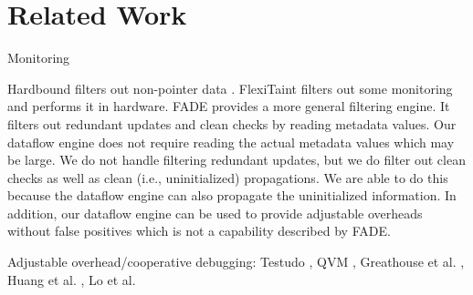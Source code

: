 \section{Related Work}
\label{sec:related}

Monitoring

Hardbound filters out non-pointer data \cite{hardbound-asplos08}. FlexiTaint filters out some monitoring
and performs it in hardware. FADE \cite{fade-hpca14} provides a more general filtering engine. It
filters out redundant updates and clean checks by reading metadata values. Our
dataflow engine does not require reading the actual metadata values which may
be large. We do not handle filtering redundant updates, but we do filter out
clean checks as well as clean (i.e., uninitialized) propagations. We are able
to do this because the dataflow engine can also propagate the uninitialized
information. In addition, our dataflow engine can be used to provide adjustable
overheads without false positives which is not a capability described by FADE.

Adjustable overhead/cooperative debugging: Testudo \cite{testudo-micro08}, QVM
\cite{qvm-oopsla08}, Greathouse et al. \cite{greathouse-cgo11}, Huang et al.
\cite{huang-sttt12}, Lo et al. \cite{lo-rtas14}
